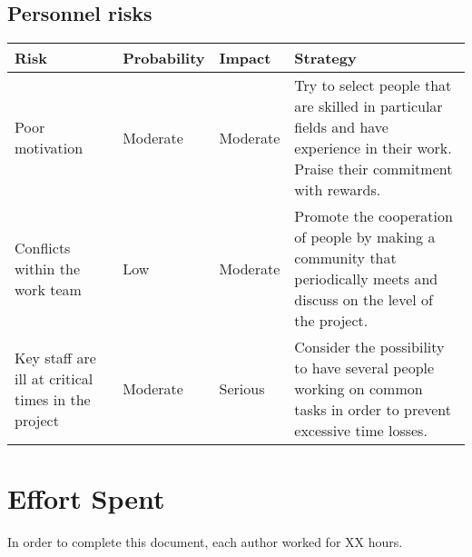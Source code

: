 \documentclass[11pt,a4paper]{report}
\begin{document}
\section{Personnel risks}
    \begin{tabularx}{\textwidth}{ |p{3cm}|p{1.8cm}|p{1.85cm}|X|}
    \hline
    Risk & Probability & Impact & Strategy \\ \hline
    Poor motivation & Moderate & Moderate & Try to select people that are skilled in particular fields and have experience in their work. Praise their commitment with rewards. \\ \hline
    Conflicts within the work team & Low & Moderate & Promote the cooperation of people by making a community that periodically meets and discuss on the level of the project. \\ \hline
    Key staff are ill at critical times in the project & Moderate & Serious & Consider the possibility to have several people working on common tasks in order to prevent excessive time losses.\\
    \hline
    \end{tabularx}
\chapter{Effort Spent}
In order to complete this document, each author worked for XX hours.
\end{document}
